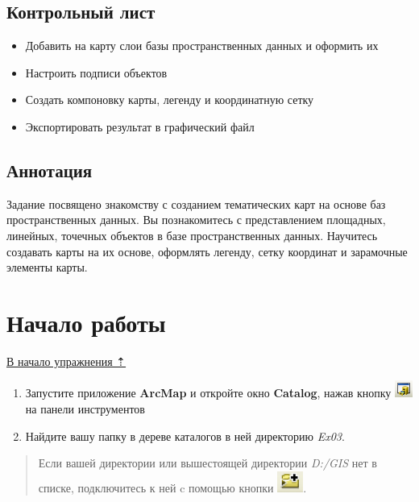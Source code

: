 \documentclass[]{book}
\providecommand{\tightlist}{%
  \setlength{\itemsep}{0pt}\setlength{\parskip}{0pt}}
\theoremstyle{definition}
\theoremstyle{definition}
\theoremstyle{definition}
\theoremstyle{remark}
\begin{document}
\hypertarget{map-design-climates-control}{%
\subsection{Контрольный лист}\label{map-design-climates-control}}

\begin{itemize}
\tightlist
\item
  Добавить на карту слои базы пространственных данных и оформить их
\item
  Настроить подписи объектов
\item
  Создать компоновку карты, легенду и координатную сетку
\item
  Экспортировать результат в графический файл
\end{itemize}

\hypertarget{map-design-climates-annotation}{%
\subsection{Аннотация}\label{map-design-climates-annotation}}

Задание посвящено знакомству с созданием тематических карт на основе баз
пространственных данных. Вы познакомитесь с представлением площадных,
линейных, точечных объектов в базе пространственных данных. Научитесь
создавать карты на их основе, оформлять легенду, сетку координат и
зарамочные элементы карты.

\hypertarget{map-design-climates-begin}{%
\section{Начало работы}\label{map-design-climates-begin}}

\protect\hyperlink{map-design-climates}{В начало упражнения ⇡}

\begin{enumerate}
\def\labelenumi{\arabic{enumi}.}
\item
  Запустите приложение \textbf{ArcMap} и откройте окно \textbf{Catalog},
  нажав кнопку \includegraphics{images/Ex03/image5.png} на панели
  инструментов
\item
  Найдите вашу папку в дереве каталогов в ней директорию \emph{Ex03}.
\end{enumerate}

\begin{quote}
Если вашей директории или вышестоящей директории \emph{D:/GIS} нет в
списке, подключитесь к ней c помощью кнопки
\includegraphics{images/Ex03/image6.png}.
\end{quote}
\end{document}
